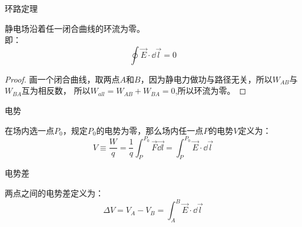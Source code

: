 \documentclass[cn,hazy,blue,14pt,normal]{elegantnote}
\numberwithin{equation}{section}
\begin{document}
\begin{theorem}
    环路定理
\end{theorem}
静电场沿着任一闭合曲线的环流为零。\\
即：
\begin{equation}\label{环路定理}
\oint\vec{E}\cdot\dd\vec{l}=0
\end{equation}
\begin{proof}
    画一个闭合曲线，取两点$A$和$B$，因为静电力做功与路径无关，所以$W_{AB}$与$W_{BA}$互为相反数，
    所以$W_{all}=W_{AB}+W_{BA}=0$,所以环流为零。
\end{proof}
\begin{definition}
    电势
\end{definition}
在场内选一点$P_0$，规定$P_0$的电势为零，那么场内任一点$P$的电势$V$定义为：
\begin{equation}\label{电势}
V \equiv \frac{W}{q} = \frac 1q\int_{P}^{P_0}\vec{F}\vec{\dd l} = \int_{P}^{P_0}\vec{E}\cdot\dd\vec{l}
\end{equation}
\begin{definition}
    电势差
\end{definition}
两点之间的电势差定义为：
$$
\Delta V = V_A - V_B = \int_{A}^{B}\vec{E}\cdot\dd\vec{l}
$$
\end{document}
